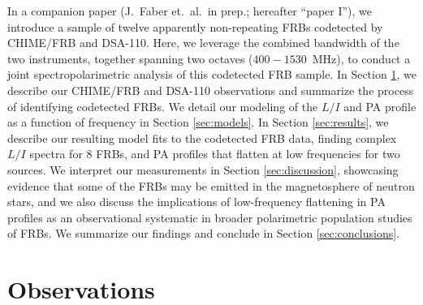 \documentclass[twocolumn, linenumbers]{aastex701}
\begin{document}
In a companion paper (J.~Faber et.~al.~in prep.; hereafter ``paper I''), we introduce a sample of twelve apparently non-repeating FRBs codetected by CHIME/FRB and DSA-110. Here, we leverage the combined bandwidth of the two instruments, together spanning two octaves ($400-1530$~MHz), to conduct a joint spectropolarimetric analysis of this codetected FRB sample. In Section \ref{sec:obs}, we describe our CHIME/FRB and DSA-110 observations and summarize the process of identifying codetected FRBs. We detail our modeling of the $L/I$ and PA profile as a function of frequency in Section \ref{sec:models}. In Section \ref{sec:results}, we describe our resulting model fits to the codetected FRB data, finding complex $L/I$ spectra for 8 FRBs, and PA profiles that flatten at low frequencies for two sources. We interpret our measurements in Section \ref{sec:discussion}, showcasing evidence that some of the FRBs may be emitted in the magnetosphere of neutron stars, and we also discuss the implications of low-frequency flattening in PA profiles as an observational systematic in broader polarimetric population studies of FRBs. We summarize our findings and conclude in Section \ref{sec:conclusions}. 


\section{Observations} \label{sec:obs}
\end{document}
